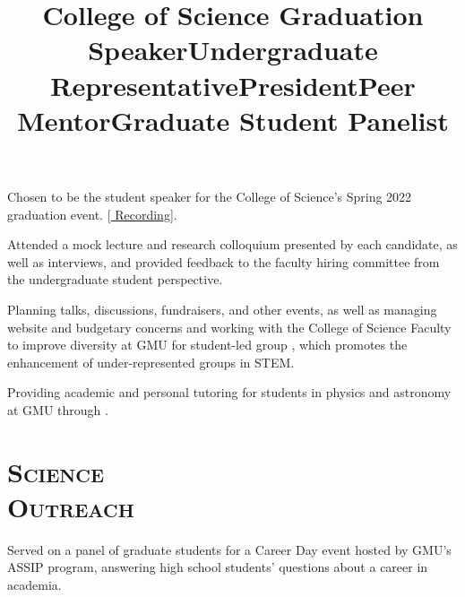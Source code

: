 \documentclass[marg, centered]{res}
\begin{document}
\begin{resume}
\title{\textbf{College of Science Graduation Speaker}}
\begin{position}
Chosen to be the student speaker for the College of Science's Spring 2022 graduation event. [\href{https://www.youtube.com/watch?v=xsyi9sqYH4o}{\color{dkbu} Recording}].
\end{position}

\vspace{-0.3cm}
\title{\textbf{Undergraduate Representative}}
\begin{position}
Attended a mock lecture and research colloquium presented by each candidate, as well as interviews, and provided feedback to the faculty hiring committee from the undergraduate student perspective.
\end{position}

\vspace{-0.3cm}
\title{\textbf{President}}
\begin{position}
Planning talks, discussions, fundraisers, and other events, as well as managing website and budgetary concerns and working with the College of Science Faculty to improve diversity at GMU for student-led group \href{https://gmuspectrum.squarespace.com/}{\color{dkbu}{Spectrum}}, which promotes the enhancement of under-represented groups in STEM.
\end{position}

\vspace{-0.3cm}
\title{\textbf{Peer Mentor}}
\begin{position}
Providing academic and personal tutoring for students in physics and astronomy at GMU through \href{https://gmuspectrum.squarespace.com/}{\color{dkbu}{Spectrum}}.
\end{position}

\section{{\scshape \bfseries Science\\ Outreach}}

\title{\textbf{Graduate Student Panelist}}
\begin{position}
Served on a panel of graduate students for a Career Day event hosted by GMU's ASSIP program, answering high school students' questions about a career in academia.
\end{position}
\vspace{-0.3cm}


\end{resume}
\end{document}

